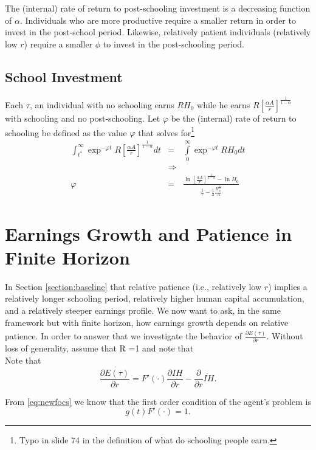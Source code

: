 \indent The (internal) rate of return to post-schooling investment is a decreasing function of $\alpha$. Individuals who are more productive require a smaller return in order to invest in the post-school period. Likewise, relatively patient individuals (relatively low $r$) require a smaller $\phi$ to invest in the post-schooling period. 

\subsection{School Investment}
Each $\tau$, an individual with no schooling earns $R H_{0}$ while he earns $R \left[ \frac{\alpha A}{r} \right]^{\frac{1}{1-\alpha}}$ with schooling and no post-schooling. Let $\varphi$ be the (internal) rate of return to schooling be defined as the value $\varphi$ that solves for\footnote{Typo in slide 74 in the definition of what do schooling people earn.}
\begin{eqnarray}
\int _{t^*} ^{\infty} \exp^{- \varphi t} R \left[ \frac{\alpha A}{r} \right]^{\frac{1}{1-\alpha}} dt &=& \int \limits _{0} ^{\infty} \exp^{- \varphi t} R H_{0} dt \nonumber \\
&\Rightarrow& \nonumber \\
\varphi &=& \frac{\ln \left[ \frac{\alpha A}{r} \right]^{\frac{1}{1 - \alpha}} - \ln H_{0}}{\frac{1}{r} - \frac{1}{2} \frac{H_{0}^{\frac{1}{2}}}{A}}
\end{eqnarray}
 
\section{Earnings Growth and Patience in Finite Horizon}
In Section \ref{section:baseline} that relative patience (i.e., relatively low $r$) implies a relatively longer schooling period, relatively higher human capital accumulation, and a relatively steeper earnings profile. We now want to ask, in the same framework but with finite horizon, how earnings growth depends on relative patience. In order to answer that we investigate the behavior of $\frac{\partial \dot{E(\tau)}}{\partial r}$. Without loss of generality, assume that R =1 and note that\\
\indent Note that
\begin{equation}
\frac{\partial \dot{E(\tau)} }{\partial r} = F'(\cdot) \frac{\partial IH}{\partial r} - \frac{\partial}{\partial r} \dot{IH}. \label{eq:earnpartialr}
\end{equation}

\noindent From \eqref{eq:newfocs} we know that the first order condition of the agent's problem is
\begin{equation}
g(t) F'(\cdot) = 1.
\end{equation}

